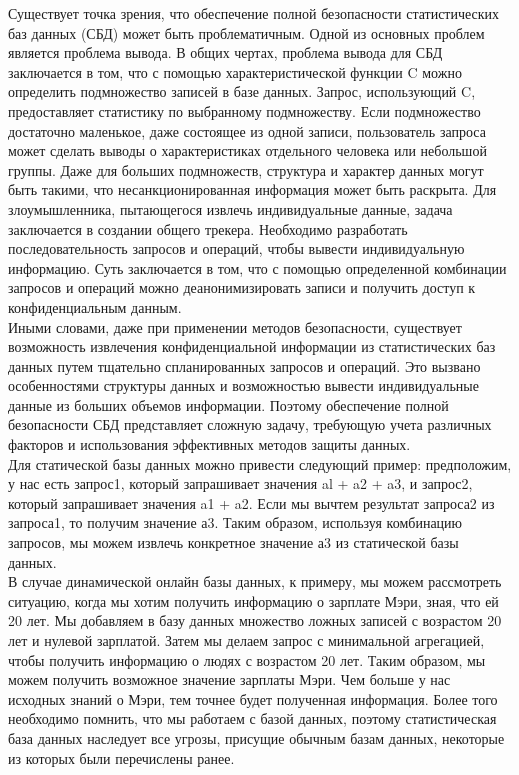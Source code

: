 Существует точка зрения, что обеспечение полной безопасности статистических баз данных (СБД) может быть проблематичным. Одной из основных проблем является проблема вывода. В общих чертах, проблема вывода для СБД заключается в том, что с помощью характеристической функции C можно определить подмножество записей в базе данных. Запрос, использующий C, предоставляет статистику по выбранному подмножеству. Если подмножество достаточно маленькое, даже состоящее из одной записи, пользователь запроса может сделать выводы о характеристиках отдельного человека или небольшой группы. Даже для больших подмножеств, структура и характер данных могут быть такими, что несанкционированная информация может быть раскрыта. Для злоумышленника, пытающегося извлечь индивидуальные данные, задача заключается в создании общего трекера. Необходимо разработать последовательность запросов и операций, чтобы вывести индивидуальную информацию. Суть заключается в том, что с помощью определенной комбинации запросов и операций можно деанонимизировать записи и получить доступ к конфиденциальным данным.
\\

Иными словами, даже при применении методов безопасности, существует возможность извлечения конфиденциальной информации из статистических баз данных путем тщательно спланированных запросов и операций. Это вызвано особенностями структуры данных и возможностью вывести индивидуальные данные из больших объемов информации. Поэтому обеспечение полной безопасности СБД представляет сложную задачу, требующую учета различных факторов и использования эффективных методов защиты данных.
\\

Для статической базы данных можно привести следующий пример: предположим, у нас есть запрос1, который запрашивает значения al + a2 + a3, и запрос2, который запрашивает значения a1 + a2. Если мы вычтем результат запроса2 из запроса1, то получим значение а3. Таким образом, используя комбинацию запросов, мы можем извлечь конкретное значение а3 из статической базы данных.
\\

В случае динамической онлайн базы данных, к примеру, мы можем рассмотреть ситуацию, когда мы хотим получить информацию о зарплате Мэри, зная, что ей 20 лет. Мы добавляем в базу данных множество ложных записей с возрастом 20 лет и нулевой зарплатой. Затем мы делаем запрос с минимальной агрегацией, чтобы получить информацию о людях с возрастом 20 лет. Таким образом, мы можем получить возможное значение зарплаты Мэри. Чем больше у нас исходных знаний о Мэри, тем точнее будет полученная информация. Более того необходимо помнить, что мы работаем с базой данных, поэтому статистическая база данных наследует все угрозы, присущие обычным базам данных, некоторые из которых были перечислены ранее.
\\


